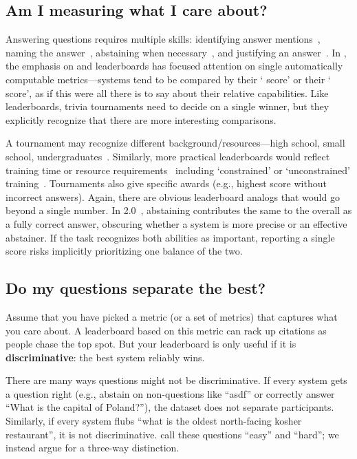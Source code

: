 \subsection{Am I measuring what I care about?}
\label{subsection:measuring-what-you-care-about}



Answering questions requires multiple skills: identifying answer mentions~\cite{hermann-15}, 
naming the answer~\cite{yih-15}, abstaining when necessary~\cite{rajpurkar-18}, and justifying an answer~\cite{fever-18}.
In \qa{}, the emphasis on  and leaderboards has focused attention on single automatically computable
metrics---systems tend to be compared by their `\squad{} score' or their ` score', as if this were all there
is to say about their relative capabilities.  Like  leaderboards, trivia tournaments need to decide
on a single winner, but they explicitly recognize that there are more interesting comparisons.

A tournament may recognize different background/resources---high school, small school, undergraduates~\cite{naqt-eligibility}.  Similarly, more practical leaderboards would reflect training time
or resource requirements~\citep[see][]{dodge-19} including `constrained' or `unconstrained'
training~\citep{bojar-2014}.
Tournaments also give specific awards (e.g., highest score without incorrect
answers).  Again, there are obvious leaderboard analogs that would go beyond a single number.  
In \squad{} 2.0~\cite{rajpurkar-18}, abstaining contributes the same
to the overall \fone{} as a fully correct answer, obscuring whether a system
is more precise or an effective abstainer.  If the task
recognizes both abilities as important, reporting a single score risks implicitly prioritizing one balance of the two.

\subsection{Do my questions separate the best?}
\label{sec:discriminative}

Assume that you have picked a metric (or a set of metrics) that captures what you care about.
A leaderboard based on this metric can rack up citations as people chase the top spot.
But your leaderboard is only useful if it is {\bf discriminative}: the best system reliably wins.

There are many ways questions might not be discriminative.  
If every system gets a question right (e.g., abstain on non-questions like ``asdf'' or correctly answer ``What is the capital of Poland?''), the dataset does not separate participants.  
Similarly, if every system flubs ``what is the oldest north-facing kosher restaurant'', it is not discriminative.
 call these questions ``easy'' and ``hard''; we instead argue for a three-way distinction.

